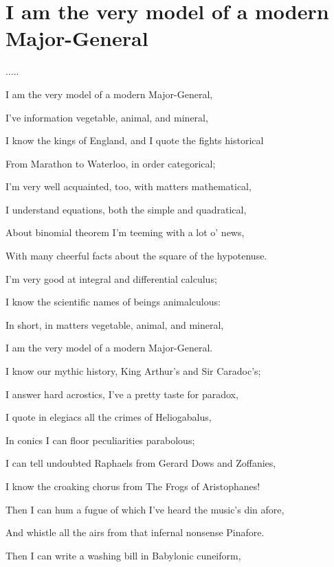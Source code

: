 \documentclass{article}
\begin{document}
\newpage

\section{I am the very model of a modern Major-General}

.....
\newline

    I am the very model of a modern Major-General,

    I've information vegetable, animal, and mineral,

    I know the kings of England, and I quote the fights historical

    From Marathon to Waterloo, in order categorical;

    I'm very well acquainted, too, with matters mathematical,

    I understand equations, both the simple and quadratical,

    About binomial theorem I'm teeming with a lot o' news,

    With many cheerful facts about the square of the hypotenuse.
\newline

    I'm very good at integral and differential calculus;

    I know the scientific names of beings animalculous:

    In short, in matters vegetable, animal, and mineral,

    I am the very model of a modern Major-General.
\newline

    I know our mythic history, King Arthur's and Sir Caradoc's;

    I answer hard acrostics, I've a pretty taste for paradox,

    I quote in elegiacs all the crimes of Heliogabalus,

    In conics I can floor peculiarities parabolous;

    I can tell undoubted Raphaels from Gerard Dows and Zoffanies,

    I know the croaking chorus from The Frogs of Aristophanes!

    Then I can hum a fugue of which I've heard the music's din afore,

    And whistle all the airs from that infernal nonsense Pinafore.

    Then I can write a washing bill in Babylonic cuneiform,
\end{document}
